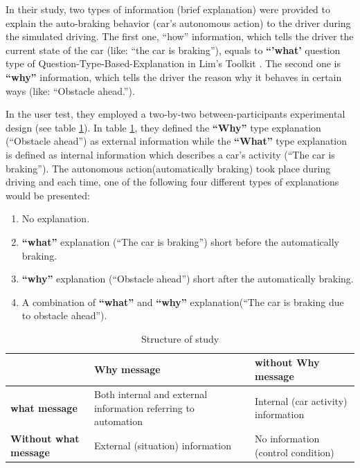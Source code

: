     \indent In their study, two types of information (brief explanation) were provided to explain the auto-braking behavior (car's autonomous action) to the driver during the simulated driving. The first one, ``how'' information, which tells the driver the current state of the car (like: ``the car is braking''), equals to \textbf{``'what'} question type of Question-Type-Based-Explanation in Lim's Toolkit \cite{lim2010toolkit}. The second one is \textbf{``why''} information, which tells the driver the reason why it behaves in certain ways (like: ``Obstacle ahead.'').

    \indent In the user test, they employed a two-by-two between-participants experimental design (see table \ref{table:2}). In table \ref{table:2}, they defined the \textbf{``Why''} type explanation (``Obstacle ahead'') as external information while the \textbf{``What''} type explanation is defined as internal information which describes a car's activity (``The car is braking''). The autonomous action(automatically braking) took place during driving and each time, one of the following four different types of explanations would be presented:
    
    \begin{enumerate}
        \item No explanation.
        \item \textbf{``what''} explanation (``The car is braking'') short before the automatically braking.
        \item \textbf{``why''} explanation (``Obstacle ahead'') short after the automatically braking.
        \item A combination of \textbf{``what''} and \textbf{``why''} explanation(``The car is braking due to obstacle ahead'').
    \end{enumerate}
    \begin{table}[ht] 
        \centering
        \begin{tabular}{ | m{2cm} | m{6em} | m{2cm} | }
        \hline
            & \bfseries Why message & \bfseries without Why message\\ [0.5ex] 
        \hline
        \bfseries what message & Both internal and external information referring to automation & Internal (car activity) information\\ 
        \hline
        \bfseries Without what message & External (situation) information & No information (control condition)\\ 
        \hline
        \end{tabular}
        \caption{Structure of study\cite{koo2015did}}
        \label{table:2}
    \end{table}

